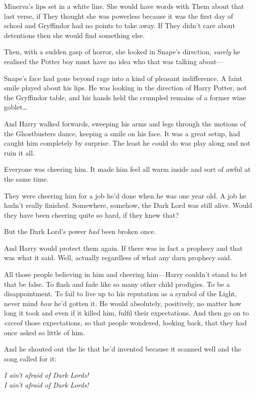 Minerva's lips set in a white line. She would have words with Them about that
last verse, if They thought she was powerless because it was the first day of
school and Gryffindor had no points to take away. If They didn't care about
detentions then she would find something else.

Then, with a sudden gasp of horror, she looked in Snape's direction,
\emph{surely} he realised the Potter boy must have no idea who that was talking
about---

Snape's face had gone beyond rage into a kind of pleasant indifference. A faint
smile played about his lips. He was looking in the direction of Harry Potter,
not the Gryffindor table, and his hands held the crumpled remains of a former
wine goblet{\ldots}

And Harry walked forwards, sweeping his arms and legs through the motions of
the Ghostbusters dance, keeping a smile on his face. It was a great setup, had
caught him completely by surprise. The least he could do was play along and not
ruin it all.

Everyone was cheering him. It made him feel all warm inside and sort of awful
at the same time.

They were cheering him for a job he'd done when he was one year old. A job he
hadn't really finished. Somewhere, somehow, the Dark Lord was still alive.
Would they have been cheering quite so hard, if they knew that?

But the Dark Lord's power \emph{had} been broken once.

And Harry would protect them again. If there was in fact a prophecy and that
was what it said. Well, actually regardless of what any darn prophecy said.

All those people believing in him and cheering him---Harry couldn't stand to
let that be false. To flash and fade like so many other child prodigies. To be
a disappointment. To fail to live up to his reputation as a symbol of the
Light, never mind \emph{how} he'd gotten it. He would absolutely, positively,
no matter how long it took and even if it killed him, fulfil their
expectations. And then go on to \emph{exceed} those expectations, so that
people wondered, looking back, that they had once asked so little of him.

And he shouted out the lie that he'd invented because it scanned well and the
song called for it:

\begin{center}
\emph{I ain't afraid of Dark Lords!\\
I ain't afraid of Dark Lords!}
\end{center}

